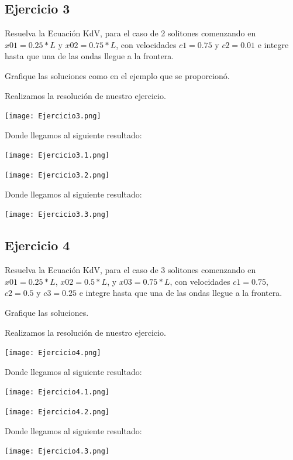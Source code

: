 \documentclass[12pt]{article}
\begin{document}


\subsection*{Ejercicio 3}

Resuelva la Ecuación KdV, para el caso de 2 solitones comenzando en $x01 = 0.25*L$ y $x02 = 0.75*L$, con velocidades $c1=0.75$ y $c2=0.01$ e integre hasta que una de las ondas llegue a la frontera.

Grafique las soluciones como en el ejemplo que se proporcionó.


Realizamos la resolución de nuestro ejercicio.

\begin{center}
    \texttt{[image: Ejercicio3.png]}
    
    Donde llegamos al siguiente resultado:
    
    \texttt{[image: Ejercicio3.1.png]}
    
     \texttt{[image: Ejercicio3.2.png]}
    
    Donde llegamos al siguiente resultado:
    
    \texttt{[image: Ejercicio3.3.png]}
\end{center}




\subsection*{Ejercicio 4}

Resuelva la Ecuación KdV, para el caso de 3 solitones comenzando en $x01 = 0.25*L$, $x02=0.5*L$, y $x03 = 0.75*L$, con velocidades $c1=0.75$, $c2=0.5$ y $c3=0.25$ e integre hasta que una de las ondas llegue a la frontera.

Grafique las soluciones.

Realizamos la resolución de nuestro ejercicio.

\begin{center}
    \texttt{[image: Ejercicio4.png]}
    
    Donde llegamos al siguiente resultado:
    
    \texttt{[image: Ejercicio4.1.png]}
    
     \texttt{[image: Ejercicio4.2.png]}
    
    Donde llegamos al siguiente resultado:
    
    \texttt{[image: Ejercicio4.3.png]}
\end{center}
\end{document}
